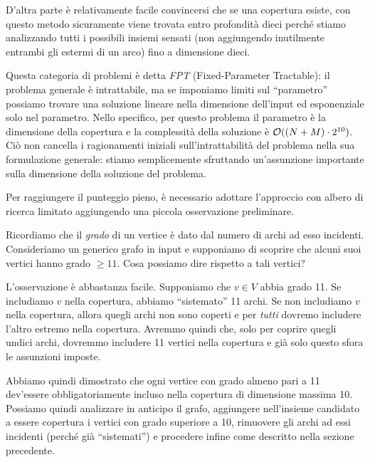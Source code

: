 \begin{solution}
D'altra parte è relativamente facile convincersi che se una copertura esiste, con questo metodo sicuramente viene trovata entro profondità dieci perché stiamo analizzando tutti i possibili insiemi sensati (non aggiungendo inutilmente entrambi gli estermi di un arco) fino a dimensione dieci.

Questa categoria di problemi è detta \emph{FPT} (Fixed-Parameter Tractable): il problema generale è intrattabile, ma se imponiamo limiti sul ``parametro'' possiamo trovare una soluzione lineare nella dimensione dell'input ed esponenziale solo nel parametro. Nello specifico, per questo problema il parametro è la dimensione della copertura e la complessità della soluzione è $\mathcal{O}((N+M) \cdot 2^{10})$. Ciò non cancella i ragionamenti iniziali sull'intrattabilità del problema nella sua formulazione generale: stiamo semplicemente sfruttando un'assunzione importante sulla dimensione della soluzione del problema. 

\Osservazione
Per raggiungere il punteggio pieno, è necessario adottare l'approccio con albero di ricerca limitato aggiungendo una piccola osservazione preliminare.

Ricordiamo che il \emph{grado} di un vertice è dato dal numero di archi ad esso incidenti. Consideriamo un generico grafo in input e supponiamo di scoprire che alcuni suoi vertici hanno grado $\ge 11$. Cosa possiamo dire rispetto a tali vertici?

L'osservazione è abbastanza facile. Supponiamo che $v \in V$ abbia grado 11. Se includiamo $v$ nella copertura, abbiamo ``sistemato'' 11 archi. Se non includiamo $v$ nella copertura, allora quegli archi non sono coperti e per \emph{tutti} dovremo includere l'altro estremo nella copertura. Avremmo quindi che, solo per coprire quegli undici archi, dovremmo includere 11 vertici nella copertura e già solo questo sfora le assunzioni imposte. 

Abbiamo quindi dimostrato che ogni vertice con grado almeno pari a 11 dev'essere obbligatoriamente incluso nella copertura di dimensione massima 10. Possiamo quindi analizzare in anticipo il grafo, aggiungere nell'insieme candidato a essere copertura i vertici con grado superiore a 10, rimuovere gli archi ad essi incidenti (perché già ``sistemati'') e procedere infine come descritto nella sezione precedente.


\Cppsol
\colorbox{white}{}

\end{solution}
